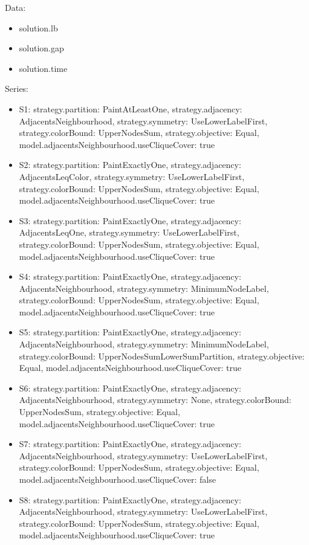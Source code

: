 \documentclass[landscape, 12pt]{report}
\begin{document}
	Data:
	\begin{itemize}
	\item solution.lb
	\item solution.gap
	\item solution.time
	\end{itemize}
	Series:
	\begin{itemize}
	\item S1: strategy.partition: PaintAtLeastOne, strategy.adjacency: AdjacentsNeighbourhood, strategy.symmetry: UseLowerLabelFirst, strategy.colorBound: UpperNodesSum, strategy.objective: Equal, model.adjacentsNeighbourhood.useCliqueCover: true
	\item S2: strategy.partition: PaintExactlyOne, strategy.adjacency: AdjacentsLeqColor, strategy.symmetry: UseLowerLabelFirst, strategy.colorBound: UpperNodesSum, strategy.objective: Equal, model.adjacentsNeighbourhood.useCliqueCover: true
	\item S3: strategy.partition: PaintExactlyOne, strategy.adjacency: AdjacentsLeqOne, strategy.symmetry: UseLowerLabelFirst, strategy.colorBound: UpperNodesSum, strategy.objective: Equal, model.adjacentsNeighbourhood.useCliqueCover: true
	\item S4: strategy.partition: PaintExactlyOne, strategy.adjacency: AdjacentsNeighbourhood, strategy.symmetry: MinimumNodeLabel, strategy.colorBound: UpperNodesSum, strategy.objective: Equal, model.adjacentsNeighbourhood.useCliqueCover: true
	\item S5: strategy.partition: PaintExactlyOne, strategy.adjacency: AdjacentsNeighbourhood, strategy.symmetry: MinimumNodeLabel, strategy.colorBound: UpperNodesSumLowerSumPartition, strategy.objective: Equal, model.adjacentsNeighbourhood.useCliqueCover: true
	\item S6: strategy.partition: PaintExactlyOne, strategy.adjacency: AdjacentsNeighbourhood, strategy.symmetry: None, strategy.colorBound: UpperNodesSum, strategy.objective: Equal, model.adjacentsNeighbourhood.useCliqueCover: true
	\item S7: strategy.partition: PaintExactlyOne, strategy.adjacency: AdjacentsNeighbourhood, strategy.symmetry: UseLowerLabelFirst, strategy.colorBound: UpperNodesSum, strategy.objective: Equal, model.adjacentsNeighbourhood.useCliqueCover: false
	\item S8: strategy.partition: PaintExactlyOne, strategy.adjacency: AdjacentsNeighbourhood, strategy.symmetry: UseLowerLabelFirst, strategy.colorBound: UpperNodesSum, strategy.objective: Equal, model.adjacentsNeighbourhood.useCliqueCover: true

\end{itemize}
\end{document}
